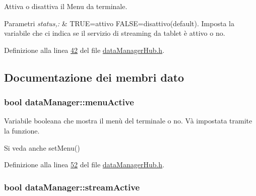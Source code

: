 \-Attiva o disattiva il \-Menu da terminale. 


\begin{DoxyParams}{\-Parametri}
{\em status,\-:} & \-T\-R\-U\-E=attivo \-F\-A\-L\-S\-E=disattivo(default). \-Imposta la variabile che ci indica se il servizio di streaming da tablet è attivo o no. \\
\hline
\end{DoxyParams}


\-Definizione alla linea \hyperlink{dataManagerHub_8h_source_l00042}{42} del file \hyperlink{dataManagerHub_8h_source}{data\-Manager\-Hub.\-h}.



\subsection{\-Documentazione dei membri dato}
\hypertarget{classdataManager_a7126a92f131b786ecf68b7a27d58d814}{
\subsubsection[{menu\-Active}]{\setlength{\rightskip}{0pt plus 5cm}bool {\bf data\-Manager\-::menu\-Active}}}\label{classdataManager_a7126a92f131b786ecf68b7a27d58d814}


\-Variabile booleana che mostra il menù del terminale o no. \-Và impostata tramite la funzione. 

\begin{DoxySeeAlso}{\-Si veda anche}
set\-Menu() 
\end{DoxySeeAlso}


\-Definizione alla linea \hyperlink{dataManagerHub_8h_source_l00052}{52} del file \hyperlink{dataManagerHub_8h_source}{data\-Manager\-Hub.\-h}.

\hypertarget{classdataManager_a73070a3be96596028b91542367e1ebdd}{
\subsubsection[{stream\-Active}]{\setlength{\rightskip}{0pt plus 5cm}bool {\bf data\-Manager\-::stream\-Active}}}\label{classdataManager_a73070a3be96596028b91542367e1ebdd}


